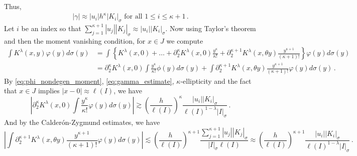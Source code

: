 \documentclass{amsart}%
\theoremstyle{plain}
\numberwithin{equation}{section}
\begin{document}
Thus, 
\begin{align}\label{eq:gamma_estimate}
	| \gamma | \approx \left | u_i \right | h^{\kappa} \left | K_i \right |_{\sigma} \text{ for all } 1 \leq i \leq \kappa+1 \, .  
\end{align}
Let $i$ be an index so that $\sum\limits_{j=1}^{\kappa+1} \left | u_j \right | \left | K_j \right |_{\sigma} \approx \left | u_i \right | \left | K_i \right |_{\sigma}$.
Now using Taylor's theorem and then the moment vanishing condition, for $x \in J$ we compute
\begin{align}
	\int K^{\lambda} (x,y) \varphi(y) d \sigma(y) &= \int \left \{ K^{\lambda} (x,0)+ \ldots + \partial_{2} ^{\kappa} K^{\lambda} (x,0)  \frac{y^{\kappa}}{\kappa!} + \partial_{2} ^{\kappa+1} K^{\lambda} (x,\theta y)  \frac{y^{\kappa+1}}{(\kappa+1)!} \right \}  \varphi(y) d \sigma(y) \label{eq:Taylor_Alpert_1d}\\
	&= \partial_{2} ^{\kappa} K^{\lambda} (x,0) \int     \frac{y^{\kappa}}{\kappa!} \phi(y) d \sigma(y) + \int \partial_{2} ^{\kappa+1} K^{\lambda} (x,\theta y)  \frac{y^{\kappa+1}}{(\kappa+1)!} \varphi(y) d \sigma(y) \nonumber \, .
\end{align}
By \eqref{eq:phi_nondegen_moment}, \eqref{eq:gamma_estimate}, $\kappa$-ellipticity and the fact that $x \in J$ implies $|x-0| \approx \ell \left (I \right )$, we have  
\[
	\left |\partial_{2} ^{\kappa} K^{\lambda} (x,0) \int     \frac{y^{\kappa}}{\kappa!} \varphi(y) d \sigma(y) \right |\gtrsim \left ( \frac{h}{\ell \left(I \right )} \right)^{\kappa} \frac{ |u_i| \left | K_i \right |_{\sigma}}{ \ell \left ( I \right )^{1- \lambda} \left | I \right |_{\sigma} } \, .
\]And by the Calder\'on-Zygmund estimates, we have 
\[
	\left | \int \partial_{2} ^{\kappa+1} K^{\lambda} (x,\theta y)  \frac{y^{\kappa+1}}{(\kappa+1)!} \varphi(y) d \sigma(y) \right |\lesssim \left ( \frac{h}{\ell \left(I \right )} \right)^{\kappa+1} \frac{\sum\limits_{j=1}^{\kappa +1} \left | u_j \right | \left | K_j \right |_{\sigma}}{ \left | I \right |_{\sigma} \ell \left ( I \right )} \approx \left ( \frac{h}{\ell \left(I \right )} \right)^{\kappa+1} \frac{\left | u_i \right | \left | K_i \right |_{\sigma}}{ \ell \left ( I \right )^{1- \lambda} \left | I \right |_{\sigma} } \, .
\]
\end{document}
